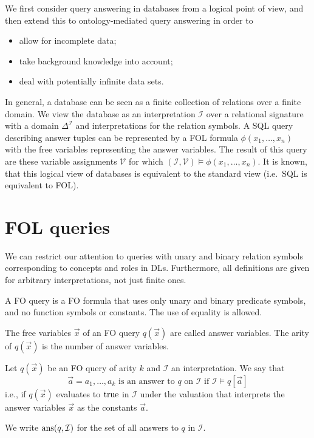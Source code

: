 We first consider query answering in databases from a logical point of view,
and then extend this to ontology-mediated query answering in order to
\begin{itemize}
	\item allow for incomplete data;
	\item take background knowledge into account;
	\item deal with potentially infinite data sets.
\end{itemize}

In general, a database can be seen as a finite collection of relations over a finite domain.
We view the database as an interpretation $\mathcal{I}$ over a relational signature with a domain $\Delta^{\mathcal{I}}$ and interpretations for the relation symbols.
A SQL query describing answer tuples can be represented by a FOL formula  $\phi(x_1, \ldots, x_n)$ with the free variables representing the answer variables.
The result of this query are these variable assignments $\mathcal{V}$ for which $(\mathcal{I}, \mathcal{V}) \vDash \phi(x_1, \ldots, x_n)$.
It is known, that this logical view of databases is equivalent to the standard view (i.e.\ SQL is equivalent to FOL).

\section{FOL queries}
We can restrict our attention to queries with unary and binary relation symbols corresponding to concepts and roles in DLs.
Furthermore, all definitions are given for arbitrary interpretations, not just finite ones.

\begin{definition}[FO query]
	A FO query is a FO formula that uses only unary and binary predicate symbols, and no function symbols or constants.
	The use of equality is allowed.

	The free variables $\vec{x}$ of an FO query $q(\vec{x})$ are called answer variables.
	The arity of $q(\vec{x})$ is the number of answer variables.

	Let $q(\vec{x})$ be an FO query of arity $k$ and $\mathcal{I}$ an interpretation.
	We say that
	\[
		\vec{a} = a_1,\ldots,a_k \text{ is an answer to $q$ on  $\mathcal{I}$ if } \mathcal{I} \vDash q[\vec{a}]
	\]
	i.e., if $q(\vec{x})$ evaluates to $\mathit{\text{true}}$ in $\mathcal{I}$ under the valuation that interprets the answer variables $\vec{x}$ as the constants $\vec{a}$.

	We write $\operatorname{\text{ans}}(q,\mathcal{I})$ for the set of all answers to $q$ in $\mathcal{I}$.
\end{definition}

